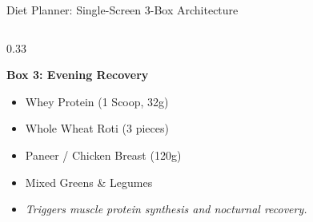 \documentclass[aspectratio=169,10pt]{beamer}
\begin{document}
\begin{frame}{Diet Planner: Single-Screen 3-Box Architecture}
\begin{columns}[T]
\begin{column}{0.33\textwidth}
\begin{block}{\textbf{Box 3: Evening Recovery}}
        \begin{itemize}
          \item Whey Protein (1 Scoop, 32g)
          \item Whole Wheat Roti (3 pieces)
          \item Paneer / Chicken Breast (120g)
          \item Mixed Greens \& Legumes
          \item \textit{Triggers muscle protein synthesis and nocturnal recovery.}
        \end{itemize}
      \end{block}
    \end{column}
  \end{columns}
\end{frame}

\end{document}

